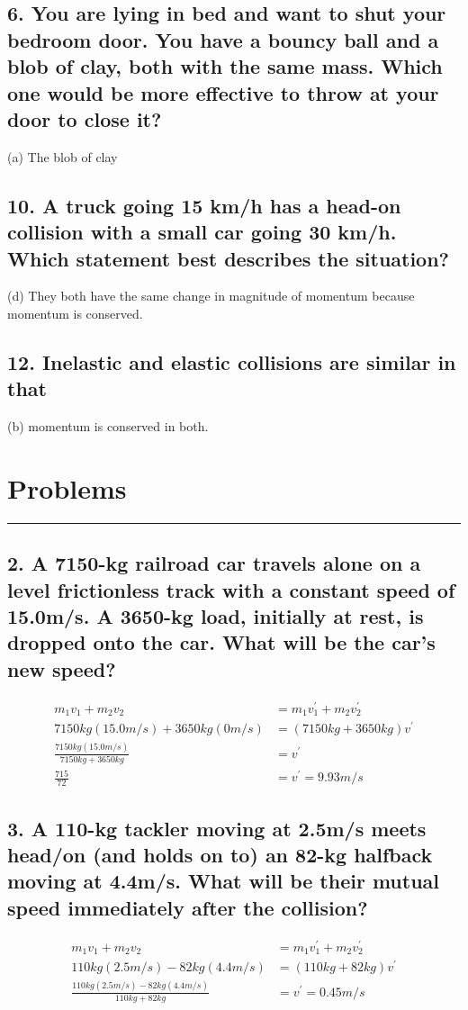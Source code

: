 \documentclass[12pt,a4paper,english]{article}
\begin{document}
\begin{flushleft}
  \subsection{6. You are lying in bed and want to shut your bedroom door. You have a bouncy ball and a blob of clay, both with the same mass. Which one would be more effective to throw at your door to close it?}
  (a) The blob of clay
  \subsection{10. A truck going 15 km/h has a head-on collision with a small car going 30 km/h. Which statement best describes the situation?}
  (d) They both have the same change in magnitude of momentum because momentum is conserved.
  \subsection{12. Inelastic and elastic collisions are similar in that}
  (b) momentum is conserved in both.

  \section*{Problems}
  \hrule
  \subsection{2. A 7150-kg railroad car travels alone on a level frictionless track with a constant speed of 15.0m/s. A 3650-kg load, initially at rest, is dropped onto the car. What will be the car's new speed?}
  \begin{align*}
    m_1v_1+m_2v_2&=m_1v_1^\prime+m_2v_2^\prime
    \\
    7150kg(15.0m/s)+3650kg(0m/s)&=(7150kg+3650kg)v^\prime
    \\
    \frac{7150kg(15.0m/s)}{7150kg+3650kg}&=v^\prime
    \\
    \frac{715}{72}&=v^\prime=9.93m/s
  \end{align*}
  \subsection{3. A 110-kg tackler moving at 2.5m/s meets head/on (and holds on to) an 82-kg halfback moving at 4.4m/s. What will be their mutual speed immediately after the collision?}
  \begin{align*}
    m_1v_1+m_2v_2&=m_1v_1^\prime+m_2v_2^\prime
    \\
    110kg(2.5m/s)-82kg(4.4m/s)&=(110kg+82kg)v^\prime
    \\
    \frac{110kg(2.5m/s)-82kg(4.4m/s)}{110kg+82kg}&=v^\prime=0.45m/s
  \end{align*}

\end{flushleft}
\end{document}
